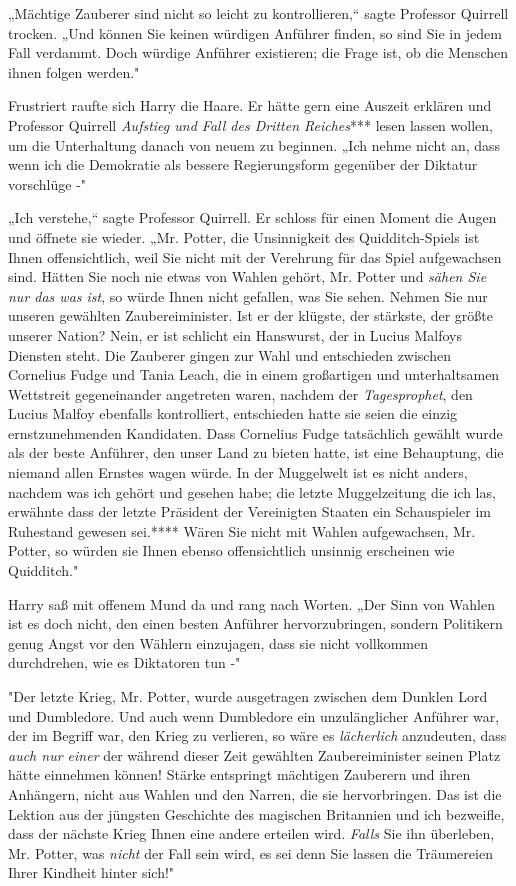 {„Mächtige Zauberer sind nicht so leicht zu kontrollieren,“ sagte Professor Quirrell trocken. „Und können Sie keinen würdigen Anführer finden, so sind Sie in jedem Fall verdammt. Doch würdige Anführer existieren; die Frage ist, ob die Menschen ihnen folgen werden."

Frustriert raufte sich Harry die Haare. Er hätte gern eine Auszeit erklären und Professor Quirrell \emph{Aufstieg und Fall des Dritten Reiches}*** lesen lassen wollen, um die Unterhaltung danach von neuem zu beginnen. „Ich nehme nicht an, dass wenn ich die Demokratie als bessere Regierungsform gegenüber der Diktatur vorschlüge -"

„Ich verstehe,“ sagte Professor Quirrell. Er schloss für einen Moment die Augen und öffnete sie wieder. „Mr. Potter, die Unsinnigkeit des Quidditch-Spiels ist Ihnen offensichtlich, weil Sie nicht mit der Verehrung für das Spiel aufgewachsen sind. Hätten Sie noch nie etwas von Wahlen gehört, Mr. Potter und \emph{sähen Sie nur das was ist}, so würde Ihnen nicht gefallen, was Sie sehen. Nehmen Sie nur unseren gewählten Zaubereiminister. Ist er der klügste, der stärkste, der größte unserer Nation? Nein, er ist schlicht ein Hanswurst, der in Lucius Malfoys Diensten steht. Die Zauberer gingen zur Wahl und entschieden zwischen Cornelius Fudge und Tania Leach, die in einem großartigen und unterhaltsamen Wettstreit gegeneinander angetreten waren, nachdem der \emph{Tagesprophet}, den Lucius Malfoy ebenfalls kontrolliert, entschieden hatte sie seien die einzig ernstzunehmenden Kandidaten. Dass Cornelius Fudge tatsächlich gewählt wurde als der beste Anführer, den unser Land zu bieten hatte, ist eine Behauptung, die niemand allen Ernstes wagen würde. In der Muggelwelt ist es nicht anders, nachdem was ich gehört und gesehen habe; die letzte Muggelzeitung die ich las, erwähnte dass der letzte Präsident der Vereinigten Staaten ein Schauspieler im Ruhestand gewesen sei.**** Wären Sie nicht mit Wahlen aufgewachsen, Mr. Potter, so würden sie Ihnen ebenso offensichtlich unsinnig erscheinen wie Quidditch."

Harry saß mit offenem Mund da und rang nach Worten. „Der Sinn von Wahlen ist es doch nicht, den einen besten Anführer hervorzubringen, sondern Politikern genug Angst vor den Wählern einzujagen, dass sie nicht vollkommen durchdrehen, wie es Diktatoren tun -"

"Der letzte Krieg, Mr. Potter, wurde ausgetragen zwischen dem Dunklen Lord und Dumbledore. Und auch wenn Dumbledore ein unzulänglicher Anführer war, der im Begriff war, den Krieg zu verlieren, so wäre es \emph{lächerlich} anzudeuten, dass \emph{auch nur einer} der während dieser Zeit gewählten Zaubereiminister seinen Platz hätte einnehmen können! Stärke entspringt mächtigen Zauberern und ihren Anhängern, nicht aus Wahlen und den Narren, die sie hervorbringen. Das ist die Lektion aus der jüngsten Geschichte des magischen Britannien und ich bezweifle, dass der nächste Krieg Ihnen eine andere erteilen wird. \emph{Falls} Sie ihn überleben, Mr. Potter, was \emph{nicht} der Fall sein wird, es sei denn Sie lassen die Träumereien Ihrer Kindheit hinter sich!"

}
